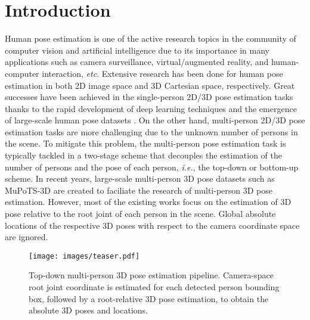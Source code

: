 \documentclass[runningheads]{llncs}
\begin{document}
\section{Introduction}
Human pose estimation is one of the active research topics in the community of computer vision and artificial intelligence due to its importance in many applications such as camera surveillance, virtual/augmented reality, and human-computer interaction, \textit{etc}.
Extensive research has been done for human pose estimation in both 2D image space and 3D Cartesian space, respectively. Great successes have been achieved in the single-person 2D/3D pose estimation tasks thanks to the rapid development of deep learning techniques and the emergence of large-scale human pose datasets \cite{andriluka14cvpr,lin2014microsoft,ionescu2014human3}. On the other hand,
multi-person 2D/3D pose estimation tasks are more challenging due to the unknown number of persons in the scene.
To mitigate this problem, the multi-person pose estimation task is typically tackled in a two-stage scheme that decouples the estimation of the number of persons and the pose of each person, \textit{i.e.}, the top-down \cite{he2017mask,fang2017rmpe,huang2017coarse,chen2018cascaded,sun2019deep} or bottom-up \cite{newell2017associative,cao2017realtime,papandreou2018personlab} scheme.
In recent years, large-scale multi-person 3D pose datasets such as MuPoTS-3D \cite{singleshotmultiperson2018} are created to faciliate the research of multi-person 3D pose estimation. However, most of the existing works \cite{dabral2019multi,rogez2017lcr,rogez2019lcr,singleshotmultiperson2018} focus on the estimation of 3D pose relative to the root joint of each person in the scene. Global absolute locations of the respective 3D poses with respect to the camera coordinate space are ignored.

\begin{figure}[t]
\centering
\texttt{[image: images/teaser.pdf]}
\caption{Top-down multi-person 3D pose estimation pipeline. Camera-space root joint coordinate is estimated for each detected person bounding box, followed by a root-relative 3D pose estimation, to obtain the absolute 3D poses and locations.}
\label{fig:teaser}
\end{figure}
\end{document}
